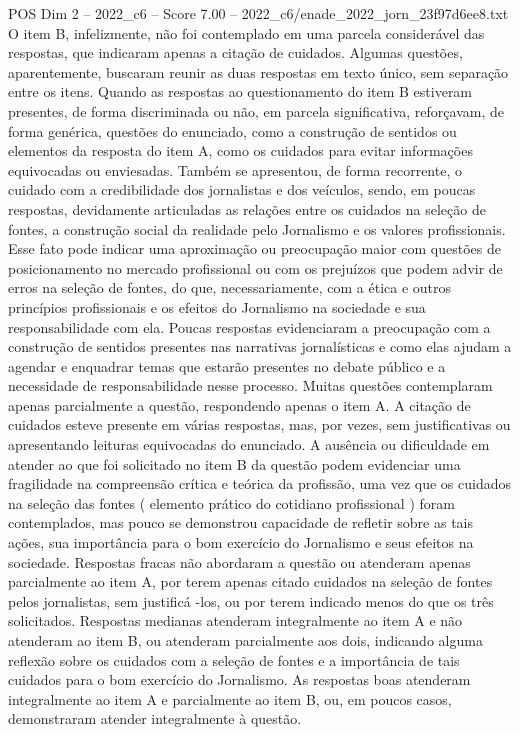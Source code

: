 \begin{textsample}{POS Dim 2 – 2022\_c6 – Score 7.00 – 2022\_c6/enade\_2022\_jorn\_23f97d6ee8.txt}
O item B, infelizmente, não foi contemplado em uma parcela considerável das respostas, que indicaram apenas a citação de cuidados.
Algumas questões, aparentemente, buscaram reunir as duas respostas em texto único, sem separação entre os itens.
Quando as respostas ao questionamento do item B estiveram presentes, de forma discriminada ou não, em parcela significativa, reforçavam, de forma genérica, questões do enunciado, como a construção de sentidos ou elementos da resposta do item A, como os cuidados para evitar informações equivocadas ou enviesadas.
Também se apresentou, de forma recorrente, o cuidado com a credibilidade dos jornalistas e dos veículos, sendo, em poucas respostas, devidamente articuladas as relações entre os cuidados na seleção de fontes, a construção social da realidade pelo Jornalismo e os valores profissionais.
Esse fato pode indicar uma aproximação ou preocupação maior com questões de posicionamento no mercado profissional ou com os prejuízos que podem advir de erros na seleção de fontes, do que, necessariamente, com a ética e outros princípios profissionais e os efeitos do Jornalismo na sociedade e sua responsabilidade com ela.
Poucas respostas evidenciaram a preocupação com a construção de sentidos presentes nas narrativas jornalísticas e como elas ajudam a agendar e enquadrar temas que estarão presentes no debate público e a necessidade de responsabilidade nesse processo.
Muitas questões contemplaram apenas parcialmente a questão, respondendo apenas o item A.
A citação de cuidados esteve presente em várias respostas, mas, por vezes, sem justificativas ou apresentando leituras equivocadas do enunciado.
A ausência ou dificuldade em atender ao que foi solicitado no item B da questão podem evidenciar uma fragilidade na compreensão crítica e teórica da profissão, uma vez que os cuidados na seleção das fontes ( elemento prático do cotidiano profissional ) foram contemplados, mas pouco se demonstrou capacidade de refletir sobre as tais ações, sua importância para o bom exercício do Jornalismo e seus efeitos na sociedade.
Respostas fracas não abordaram a questão ou atenderam apenas parcialmente ao item A, por terem apenas citado cuidados na seleção de fontes pelos jornalistas, sem justificá -los, ou por terem indicado menos do que os três solicitados.
Respostas medianas atenderam integralmente ao item A e não atenderam ao item B, ou atenderam parcialmente aos dois, indicando alguma reflexão sobre os cuidados com a seleção de fontes e a importância de tais cuidados para o bom exercício do Jornalismo.
As respostas boas atenderam integralmente ao item A e parcialmente ao item B, ou, em poucos casos, demonstraram atender integralmente à questão.

\end{textsample}
